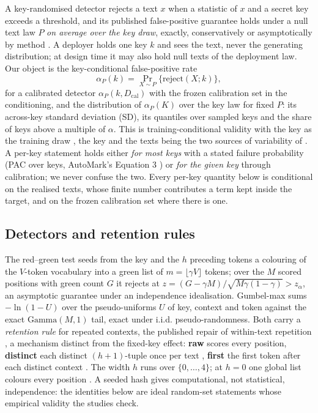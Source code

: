 \documentclass[11pt,letterpaper]{article}
\begin{document}
A key-randomised detector rejects a text \(x\) when a statistic of \(x\) and a secret key exceeds a threshold, and its published false-positive guarantee holds under a null text law \(P\) \emph{on average over the key draw}, exactly, conservatively or asymptotically by method \citep{kirchenbauer2023watermark, kuditipudi2024distortion, li2025framework}. A deployer holds one key \(k\) and sees the text, never the generating distribution; at design time it may also hold null texts of the deployment law. Our object is the key-conditional false-positive rate \[\alpha_P(k) = \Pr_{X \sim P}\{\text{reject}(X; k)\},\] for a calibrated detector \(\alpha_P(k, D_{\mathrm{cal}})\) with the frozen calibration set in the conditioning, and the distribution of \(\alpha_P(K)\) over the key law for fixed \(P\): its across-key standard deviation (SD), its quantiles over sampled keys and the share of keys above a multiple of \(\alpha\). This is training-conditional validity with the key as the training draw \citep{vovk2012conditional, bian2023training, liang2025algorithmic}, the key and the texts being the two sources of variability of \citet{ren2022derandomized}. A per-key statement holds either \emph{for most keys} with a stated failure probability (PAC over keys, AutoMark's Equation 3 \citep{gloaguen2026automark}) or \emph{for the given key} through calibration; we never confuse the two. Every per-key quantity below is conditional on the realised texts, whose finite number contributes a term kept inside the target, and on the frozen calibration set where there is one.

\hypertarget{detectors-and-retention-rules}{%
\subsection{Detectors and retention rules}\label{detectors-and-retention-rules}}

The red--green test \citep{kirchenbauer2023watermark} seeds from the key and the \(h\) preceding tokens a colouring of the \(V\)-token vocabulary into a green list of \(m = \lfloor \gamma V \rfloor\) tokens; over the \(M\) scored positions with green count \(G\) it rejects at \(z = (G - \gamma M)/\sqrt{M\gamma(1-\gamma)} > z_\alpha\), an asymptotic guarantee under an independence idealisation. Gumbel-max \citep{aaronson2022lecture, kuditipudi2024distortion} sums \(-\ln(1 - U)\) over the pseudo-uniforms \(U\) of key, context and token against the exact \(\mathrm{Gamma}(M, 1)\) tail, exact under i.i.d. pseudo-randomness. Both carry a \emph{retention rule} for repeated contexts, the published repair of within-text repetition \citep{fernandez2023bricks, kirchenbauer2024reliability}, a mechanism distinct from the fixed-key effect: \textbf{raw} scores every position, \textbf{distinct} each distinct \((h+1)\)-tuple once per text \citep{fernandez2023bricks}, \textbf{first} the first token after each distinct context \citep{openai2026textgrain}. The width \(h\) runs over \(\{0, \dots, 4\}\); at \(h = 0\) one global list colours every position \citep{zhao2024unigram}. A seeded hash gives computational, not statistical, independence: the identities below are ideal random-set statements whose empirical validity the studies check.
\end{document}
